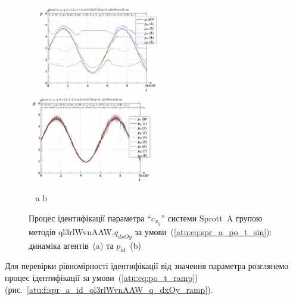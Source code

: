 \begin{figure}[htb!]
\begin{center}
  ~ \hfill
    \includegraphics[width=0.49\textwidth]{p/cha/spr_a/ql3rlWvnAAW_dxOy/sprott_a_id2-p_t_pi_ql3rlWvnAAW_sin.png}
    \hfill
    \includegraphics[width=0.49\textwidth]{p/cha/spr_a/ql3rlWvnAAW_dxOy/sprott_a_id2-p_t_p_ql3rlWvnAAW_sin.png}
  \hfill ~
\end{center}
  \vspace{-1.0ex}
  \begin{center}
    ~ \hfill a \hfill\hfill b \hfill ~
  \end{center}
  \caption{Процес ідентифікації параметра ``$c_{x_y}$'' системи Sprott~A групою методів ql3rlWvnAAW.$q_{dxOy}$ за умови~(\ref{atu:eq:spr_a_po_t_sin}): динаміка агентів~(a) та $p_\mathrm{id}$~(b)}
  \label{atu:f:spr_a_id_ql3rlWvnAAW_q_dxOy_sin}
\end{figure}

Для перевірки рівномірності ідентифікації від
значення параметра розглянемо процес ідентифікації за
умови~(\ref{atu:eq:po_t_ramp}) (рис.~\ref{atu:f:spr_a_id_ql3rlWvnAAW_q_dxOy_ramp}).

